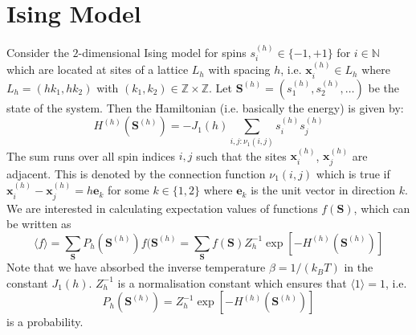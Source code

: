 \documentclass[11pt]{article}
\renewcommand{\vec}[1]{\boldsymbol{#1}}
\begin{document}
\section{Ising Model}
Consider the $2$-dimensional Ising model for spins $s^{(h)}_i\in\{-1,+1\}$ for $i\in\mathbb{N}$ which are located at sites of a lattice $L_h$ with spacing $h$, i.e. $\vec{x}^{(h)}_i\in L_h$ where $L_h = (h k_1,h k_2)$ with $(k_1,k_2)\in\mathbb{Z}\times \mathbb{Z}$. Let $\vec{S}^{(h)}=(s^{(h)}_1,s^{(h)}_2,\dots)$ be the state of the system. Then the Hamiltonian (i.e. basically the energy) is given by:
\begin{equation}
  H^{(h)}(\vec{S}^{(h)}) = -J_1(h)\sum_{i,j: \nu_1(i,j)} s^{(h)}_i s^{(h)}_j 
\end{equation}
The sum runs over all spin indices $i,j$ such that the sites $\vec{x}^{(h)}_i$, $\vec{x}^{(h)}_j$ are adjacent. This is denoted by the connection function $\nu_1(i,j)$ which is true if $\vec{x}^{(h)}_i-\vec{x}^{(h)}_j=h \vec{e}_k$ for some $k\in\{1,2\}$ where $\vec{e}_k$ is the unit vector in direction $k$.
We are interested in calculating expectation values of functions $f(\vec{S})$, which can be written as
\begin{equation}
  \langle f \rangle = \sum_{\vec{S}} P_h(\vec{S}^{(h)})f(\vec{S}^{(h)} = \sum_{\vec{S}} f(\vec{S}) Z_h^{-1} \exp\left[-H^{(h)}(\vec{S}^{(h)})\right]
\end{equation}
Note that we have absorbed the inverse temperature $\beta = 1/(k_BT)$ in the constant $J_1(h)$. $Z_h^{-1}$ is a normalisation constant which ensures that $\langle 1 \rangle=1$, i.e.
\begin{equation}
  P_h(\vec{S}^{(h)}) = Z_h^{-1}\exp\left[-H^{(h)}(\vec{S}^{(h)})\right]
\end{equation}
is a probability.
\end{document}
